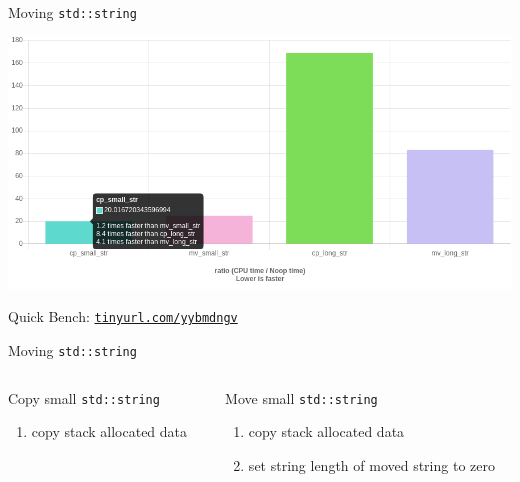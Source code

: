 \documentclass[compress,aspectratio=1610]{beamer}
\begin{document}
\begin{frame}{Moving \texttt{std::string}}
    \centering

    \includegraphics[width=.9\textwidth]{benchmark_str_cp_mv.png}

    Quick Bench: \href{http://quick-bench.com/l_4Ith4ZvZbSE0UIfIQXVpkg84A}{\texttt{tinyurl.com/yybmdngv}}
\end{frame}

\begin{frame}[fragile]{Moving \texttt{std::string}}
    \centering

    \begin{columns}[t]
        \begin{column}{.45\textwidth}
            \begin{block}{Copy small \texttt{std::string}}
                \begin{enumerate}
                    \item copy stack allocated data
                \end{enumerate}
            \end{block}
        \end{column}
        \begin{column}{.45\textwidth}
            \begin{block}{Move small \texttt{std::string}}
                \begin{enumerate}
                    \item copy stack allocated data
                    \item set string length of moved string to zero
                \end{enumerate}
            \end{block}
        \end{column}
    \end{columns}

    \vspace{5mm}

    \begin{center}
    \end{center}
\end{frame}
\end{document}

